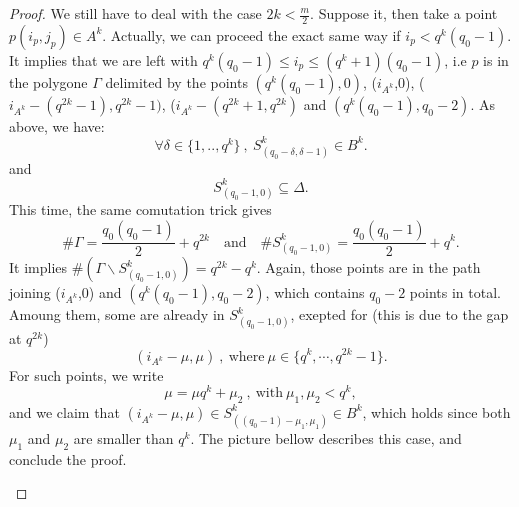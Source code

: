 \documentclass[a4paper]{article}
\begin{document}
\begin{proof}
We still have to deal with the case $2k < \frac{m}{2}$. Suppose it, then take a point $p(i_p,j_p) \in A^k$. Actually, we can proceed the exact same way if $i_p < q^k(q_0-1)$. It implies that we are left with $q^k(q_0-1) \leq i_p \leq (q^k+1)(q_0-1)$, i.e $p$ is in the polygone $\Gamma$ delimited by the points $(q^k(q_0-1),0)$, ($i_{A^k}$,0), ($i_{A^k}-(q^{2k}-1),q^{2k}-1)$, ($i_{A^k}-(q^{2k}+1,q^{2k})$ and $(q^k(q_0-1),q_0-2)$. As above, we have:
 \[ \forall \delta \in \{1,..,q^k\} \ , \ S^k_{(q_0-\delta,\delta-1)} \in B^k.\]
 and 
 \[S^k_{(q_0-1,0)} \subseteq \Delta.\]
This time, the same comutation trick gives
\[ \# \Gamma = \dfrac{q_0(q_0-1)}{2}+q^{2k} \quad \mathrm{and} \quad \# S^k_{(q_0-1,0)} = \dfrac{q_0(q_0-1)}{2}+q^{k}.\]
It implies $\# (\Gamma \backslash  S^k_{(q_0-1,0)}) = q^{2k}-q^k$. Again, those points are in the path joining ($i_{A^k}$,0) and  $(q^k(q_0-1),q_0-2)$, which contains $q_0-2$ points in total. Amoung them, some are already in $S^k_{(q_0-1,0)}$, exepted for (this is due to the gap at $q^{2k}$) 
\[ (i_{A^k}-\mu,\mu) \ , \ \mathrm{where} \ \mu \in \{q^k,\cdots,q^{2k}-1\}.\]
For such points, we write
\[\mu = \mu q^k + \mu_2 \ , \ \mathrm{with} \ \mu_1,\mu_2 < q^k,\]
and we claim that $(i_{A^k}-\mu,\mu) \in S^k_{((q_0-1)-\mu_1,\mu_1)} \in B^k$, which holds since both $\mu_1$ and $\mu_2$ are smaller than $q^k$. The picture bellow describes this case, and conclude the proof.

 \begin{figure}[h]
\begin{center}
\end{center}
\end{figure}
\end{proof}
\end{document}
